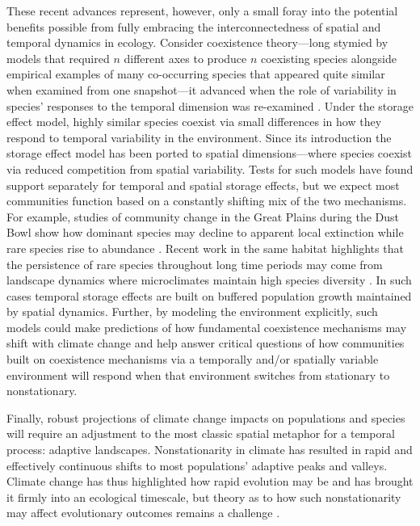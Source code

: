 \documentclass[11pt,a4paper,oneside]{article}
\begin{document}
These recent advances represent, however, only a small foray into the potential benefits possible from fully embracing the interconnectedness of spatial and temporal dynamics in ecology. Consider coexistence theory---long stymied by models that required \(n\) different axes to produce \(n\) coexisting species alongside empirical examples of many co-occurring species that appeared quite similar when examined from one snapshot---it advanced when the role of variability in species' responses to the temporal dimension was re-examined \citep{Chesson:1997dz}. Under the storage effect model, highly similar species coexist via small differences in how they respond to temporal variability in the environment. Since its introduction the storage effect model has been ported to spatial dimensions---where species coexist via reduced competition from spatial variability. Tests for such models have found support separately for temporal \citep{Angert:2009} and spatial \citep{Sears:2007md} storage effects, but we expect most communities function based on a constantly shifting mix of the two mechanisms. For example, studies of community change in the Great Plains during the Dust Bowl show how dominant species may decline to apparent local extinction while rare species rise to abundance \citep{Weaver1936}. Recent work in the same habitat highlights that the persistence of rare species throughout long time periods may come from landscape dynamics where microclimates maintain high species diversity \citep{Craine2012}. In such cases temporal storage effects are built on buffered population growth maintained by spatial dynamics. Further, by modeling the environment explicitly, such models could make predictions of how fundamental coexistence mechanisms may shift with climate change and help answer critical questions of how communities built on coexistence mechanisms via a temporally and/or spatially variable environment will respond when that environment switches from stationary to nonstationary. 

Finally, robust projections of climate change impacts on populations and species will require an adjustment to the most classic spatial metaphor for a temporal process: adaptive landscapes. Nonstationarity in climate has resulted in rapid and effectively continuous shifts to most populations' adaptive peaks and valleys. Climate change has thus highlighted how rapid evolution may be and has brought it firmly into an ecological timescale, but theory as to how such nonstationarity may affect evolutionary outcomes remains a challenge \citep{schoener2011,Bailey2014}. \\ %
\end{document}
